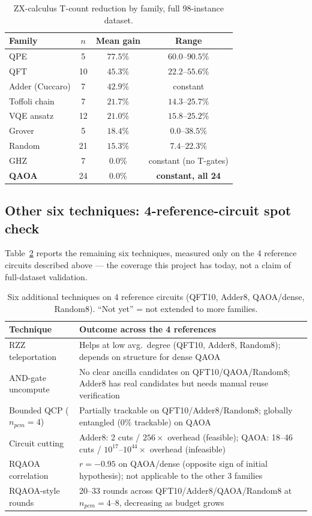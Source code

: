 \documentclass[9pt,twocolumn]{extarticle}
\begin{document}
\begin{table}[t]
\centering\footnotesize
\caption{ZX-calculus T-count reduction by family, full 98-instance dataset.}
\label{tab:zxfamily}
\begin{tabular}{@{}lccc@{}}
\toprule
Family & $n$ & Mean gain & Range \\
\midrule
QPE & 5 & $77.5\%$ & $60.0$--$90.5\%$ \\
QFT & 10 & $45.3\%$ & $22.2$--$55.6\%$ \\
Adder (Cuccaro) & 7 & $42.9\%$ & constant \\
Toffoli chain & 7 & $21.7\%$ & $14.3$--$25.7\%$ \\
VQE ansatz & 12 & $21.0\%$ & $15.8$--$25.2\%$ \\
Grover & 5 & $18.4\%$ & $0.0$--$38.5\%$ \\
Random & 21 & $15.3\%$ & $7.4$--$22.3\%$ \\
GHZ & 7 & $0.0\%$ & constant (no T-gates) \\
\textbf{QAOA} & 24 & $\mathbf{0.0\%}$ & \textbf{constant, all 24} \\
\bottomrule
\end{tabular}
\end{table}

\subsection{Other six techniques: 4-reference-circuit spot check}
Table~\ref{tab:othertech} reports the remaining six techniques, measured
only on the 4 reference circuits described above --- the coverage this
project has today, not a claim of full-dataset validation.

\begin{table}[t]
\centering\footnotesize
\caption{Six additional techniques on 4 reference circuits (QFT10, Adder8,
QAOA/dense, Random8). ``Not yet'' = not extended to more families.}
\label{tab:othertech}
\begin{tabular}{@{}p{2.3cm}p{5.3cm}@{}}
\toprule
Technique & Outcome across the 4 references \\
\midrule
RZZ teleportation & Helps at low avg.\ degree (QFT10, Adder8, Random8);
depends on structure for dense QAOA \\
AND-gate uncompute & No clear ancilla candidates on QFT10/QAOA/Random8;
Adder8 has real candidates but needs manual reuse verification \\
Bounded QCP ($n_{pcm}{=}4$) & Partially trackable on QFT10/Adder8/Random8;
globally entangled (0\% trackable) on QAOA \\
Circuit cutting & Adder8: 2 cuts / $256\times$ overhead (feasible); QAOA:
18--46 cuts / $10^{17}$--$10^{44}\times$ overhead (infeasible) \\
RQAOA correlation & $r=-0.95$ on QAOA/dense (opposite sign of initial
hypothesis); not applicable to the other 3 families \\
RQAOA-style rounds & 20--33 rounds across QFT10/Adder8/QAOA/Random8 at
$n_{pcm}=4$--$8$, decreasing as budget grows \\
\bottomrule
\end{tabular}
\end{table}
\end{document}
